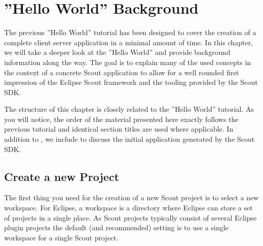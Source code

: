 \documentclass[a4paper,10pt,twoside]{book}
\begin{document}
\chapter{''Hello World'' Background}

The previous ''Hello World'' tutorial has been designed to cover the creation of a complete client server application in a minimal amount of time.
In this chapter, we will take a deeper look at the ''Hello World'' and provide background information along the way.
The goal is to explain many of the used concepts in the context of a concrete Scout application to allow for a well rounded first impression of the Eclipse Scout framework and the tooling provided by the Scout SDK.

The structure of this chapter is closely related to the ''Hello World'' tutorial.
As you will notice, the order of the material presented here exactly follows the previous tutorial and identical section titles are used where applicable.
In addition to , we include  to discuss the initial application generated by the Scout SDK.

\section{Create a new Project}

The first thing you need for the creation of a new Scout project is to select a new workspace.
For Eclipse, a workspace is a directory where Eclipse can store a set of projects in a single place.
As Scout projects typically consist of several Eclipse plugin projects the default (and recommended) setting is to use a single workspace for a single Scout project.
\end{document}
